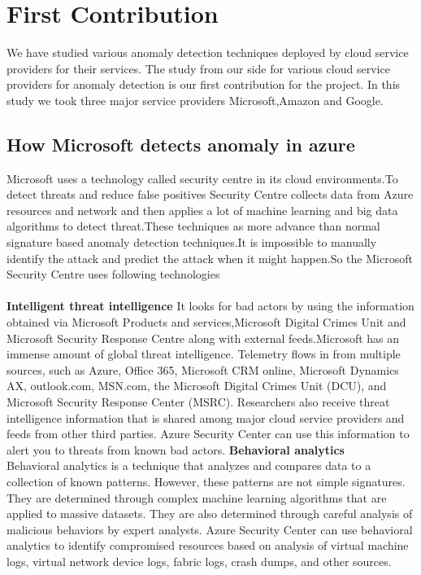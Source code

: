 \chapter{First Contribution}
\label{chap:chapter3}
We have studied various anomaly detection techniques deployed by cloud service providers for their services. The study from our side for various cloud service providers for anomaly detection is our first contribution for the project. In this study we took three major service providers Microsoft,Amazon and Google.\\
\section{How Microsoft detects anomaly in azure}
Microsoft uses a technology called security centre\cite{microsf41} in its cloud environments.To detect threats and reduce false positives Security Centre collects data from Azure resources and network and then applies a lot of  machine learning and big data algorithms to detect threat.These techniques as more advance than normal signature based anomaly detection techniques.It is impossible to manually identify the attack and predict the attack when it might happen.So the Microsoft \\ Security Centre uses following technologies\\\\
\textbf{Intelligent threat intelligence} \newline It looks for bad actors by using the information obtained via Microsoft Products and services,Microsoft Digital Crimes Unit and Microsoft Security Response Centre along with external feeds.Microsoft has an immense amount of global threat intelligence. Telemetry flows in from multiple sources, such as Azure, Office 365, Microsoft CRM online, Microsoft Dynamics AX, outlook.com, MSN.com, the Microsoft Digital Crimes Unit (DCU), and Microsoft Security Response Center (MSRC). Researchers also receive threat intelligence information that is shared among major cloud service providers and feeds from other third parties. Azure Security Center can use this information to alert you to threats from known bad actors.\newline \newline
\textbf{Behavioral analytics} \\ Behavioral analytics is a technique that analyzes and compares data to a collection of known patterns. However, these patterns are not simple signatures. They are determined through complex machine learning algorithms that are applied to massive datasets. They are also determined through careful analysis of malicious behaviors by expert analysts. Azure Security Center can use behavioral analytics to identify compromised resources based on analysis of virtual machine logs, virtual network device logs, fabric logs, crash dumps, and other sources.
